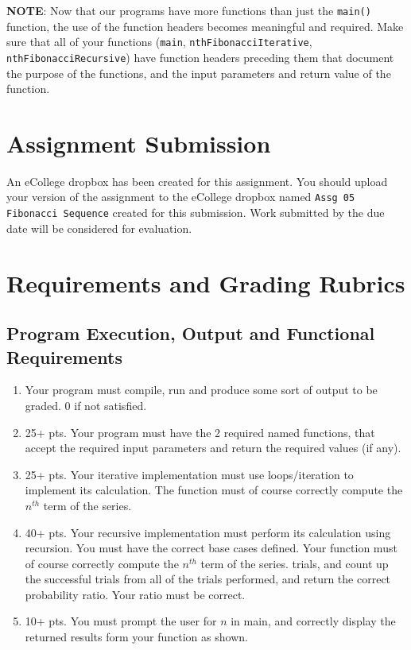 \documentclass[11pt]{article}
\begin{document}
\textbf{NOTE}: Now that our programs have more functions than just the
\verb~main()~ function, the use of the function headers becomes meaningful
and required.  Make sure that all of your functions (\verb~main~,
\verb~nthFibonacciIterative~, \verb~nthFibonacciRecursive~) have function
headers preceding them that document the purpose of the functions, and
the input parameters and return value of the function.
\section*{Assignment Submission}
\label{sec-4}

An eCollege dropbox has been created for this assignment.  You should
upload your version of the assignment to the eCollege dropbox named
\verb~Assg 05 Fibonacci Sequence~ created for this submission.  Work
submitted by the due date will be considered for evaluation.
\section*{Requirements and Grading Rubrics}
\label{sec-5}

\subsection*{Program Execution, Output and Functional Requirements}
\label{sec-5-1}

\begin{enumerate}
\item Your program must compile, run and produce some sort of output to be
graded. 0 if not satisfied.
\item 25+ pts.  Your program must have the 2 required named functions,
that accept the required input parameters and return the required
values (if any).
\item 25+ pts. Your iterative implementation must use loops/iteration to implement
its calculation.  The function must of course correctly compute the $n^{th}$
term of the series.
\item 40+ pts. Your recursive implementation must perform its calculation using
recursion.  You must have the correct base cases defined.  Your function must
of course correctly compute the $n^{th}$ term of the series.
trials, and count up the successful trials from all of the trials performed,
and return the correct probability ratio.  Your ratio must be correct.
\item 10+ pts. You must prompt the user for $n$ in main, and correctly display
the returned results form your function as shown.
\end{enumerate}
\end{document}
